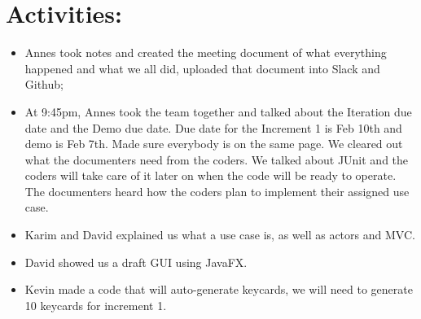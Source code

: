 \documentclass[12pt]{article}
\begin{document}
\section{Activities:} 
\begin{itemize}
\item Annes took notes and created the meeting document of what everything happened and what we all did, uploaded that document into Slack and Github;
\item At 9:45pm, Annes took the team together and talked about the Iteration due date and the Demo due date. Due date for the Increment 1 is Feb 10th and demo is Feb 7th. Made sure everybody is on the same page. We cleared out what the documenters need from the coders. We talked about JUnit and the coders will take care of it later on when the code will be ready to operate. The documenters heard how the coders plan to implement their assigned use case. 
\item Karim and David explained us what a use case is, as well as actors and MVC.
\item David showed us a draft GUI using JavaFX.\\
\item Kevin made a code that will auto-generate keycards, we will need to generate 10 keycards for increment 1.

\end{itemize}
\end{document}
